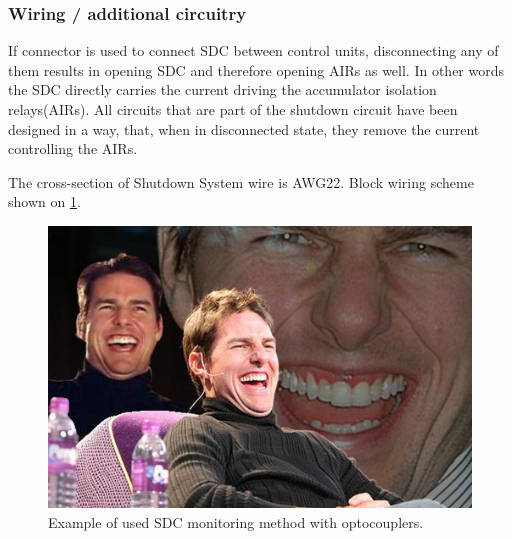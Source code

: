 \subsubsection{Wiring / additional circuitry}

If connector is used to connect SDC between control units, disconnecting any of them results in opening SDC and therefore opening AIRs as well. In other words the SDC directly carries the current driving the accumulator isolation relays(AIRs). All circuits that are part of the shutdown circuit have been designed in a way, that, when in disconnected state, they remove the current controlling the AIRs.

The cross-section of Shutdown System wire is AWG22. Block wiring scheme shown on \ref{fig:SDC-schematic}.\\

\begin{figure}[H]
	\centering
	\includegraphics[width=\textwidth]{./img/sdc-schematic.jpg}
	\caption{Example of used SDC monitoring method with optocouplers.}
	\label{fig:SDC-schematic}
\end{figure}

